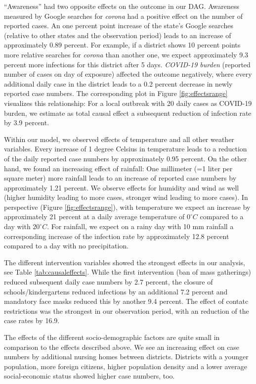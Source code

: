 \documentclass[]{elsarticle} %
\begin{document}
``Awareness'' had two opposite effects on the outcome in our DAG. Awareness measured by Google searches for \emph{corona} had a positive effect on the number of reported cases. An one percent point increase of the state's Google searches (relative to other states and the observation period) leads to an increase of approximately 0.89 percent. For example, if a district shows 10 percent points more relative searches for \emph{corona} than another one, we expect approximately 9.3 percent more infections for this district after 5 days. \emph{COVID-19 burden} (reported number of cases on day of exposure) affected the outcome negatively, where every additional daily case in the district leads to a 0.2 percent decrease in newly reported case numbers. The corresponding plot in Figure \ref{fig:effectsrange} visualizes this relationship: For a local outbreak with 20 daily cases as COVID-19 burden, we estimate as total causal effect a subsequent reduction of infection rate by 3.9 percent.

Within our model, we observed effects of temperature and all other weather variables. Every increase of 1 degree Celsius in temperature leads to a reduction of the daily reported case numbers by approximately 0.95 percent. On the other hand, we found an increasing effect of rainfall: One millimeter (=1 liter per square meter) more rainfall leads to an increase of reported case numbers by approximately 1.21 percent. We observe effects for humidity and wind as well (higher humidity leading to more cases, stronger wind leading to more cases). In perspective (Figure \ref{fig:effectsrange}), with temperature we expect an increase by approximately 21 percent at a daily average temperature of \(0^{\circ}C\) compared to a day with \(20^{\circ}C\). For rainfall, we expect on a rainy day with 10 mm rainfall a corresponding increase of the infection rate by approximately 12.8 percent compared to a day with no precipitation.

The different intervention variables showed the strongest effects in our analysis, see Table \ref{tab:causaleffects}. While the first intervention (ban of mass gatherings) reduced subsequent daily case numbers by 2.7 percent, the closure of schools/kindergartens reduced infections by an additional 7.2 percent and mandatory face masks reduced this by another 9.4 percent. The effect of contatc restrictions was the strongest in our observation period, with an reduction of the case rates by 16.9.

The effects of the different socio-demographic factors are quite small in comparison to the effects described above. We see an increasing effect on case numbers by additional nursing homes between districts. Districts with a younger population, more foreign citizens, higher population density and a lower average social-economic status showed higher case numbers, too.
\end{document}
